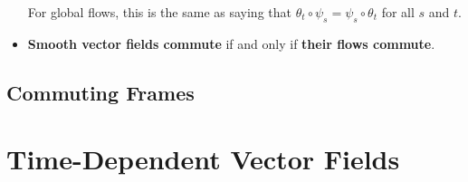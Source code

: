 \documentclass[11pt]{article}
\begin{document}
\begin{itemize}
\begin{definition}
For global flows, this is the same as saying that $\theta_t \circ \psi_s = \psi_s  \circ \theta_t$ for all $s$ and $t$.
\end{definition}

\item 
\begin{theorem}
\textbf{Smooth vector fields commute} if and only if \textbf{their flows commute}.
\end{theorem}
\end{itemize}

\subsection{Commuting Frames}

\section{Time-Dependent Vector Fields}



\newpage


\end{document}
